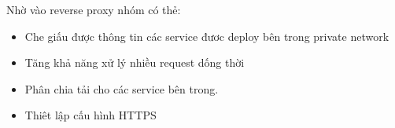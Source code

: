 \begin{itemize}
            Nhờ vào reverse proxy nhóm có thẻ:
            
            \begin{itemize}
                \item Che giấu được thông tin các service đươc deploy bên trong private network
                \item Tăng khả năng xử lý nhiều request dống thời
                \item Phân chia tải cho các service bên trong.
                \item Thiêt lập cấu hình HTTPS
            \end{itemize}
          
            
            
            
            
            
		\end{itemize}